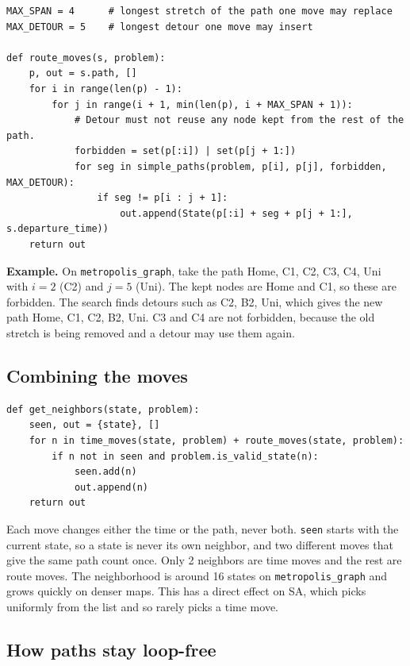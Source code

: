 \documentclass[11pt,a4paper]{article}
\newcommand{\col}[1]{\texttt{#1}}
\begin{document}
\begin{lstlisting}
MAX_SPAN = 4      # longest stretch of the path one move may replace
MAX_DETOUR = 5    # longest detour one move may insert

def route_moves(s, problem):
    p, out = s.path, []
    for i in range(len(p) - 1):
        for j in range(i + 1, min(len(p), i + MAX_SPAN + 1)):
            # Detour must not reuse any node kept from the rest of the path.
            forbidden = set(p[:i]) | set(p[j + 1:])
            for seg in simple_paths(problem, p[i], p[j], forbidden, MAX_DETOUR):
                if seg != p[i : j + 1]:
                    out.append(State(p[:i] + seg + p[j + 1:], s.departure_time))
    return out
\end{lstlisting}

\noindent\textbf{Example.} On \col{metropolis\_graph}, take the path Home, C1, C2, C3, C4, Uni with
$i = 2$ (C2) and $j = 5$ (Uni). The kept nodes are Home and C1, so these are forbidden. The search
finds detours such as C2, B2, Uni, which gives the new path Home, C1, C2, B2, Uni. C3 and C4 are not
forbidden, because the old stretch is being removed and a detour may use them again.

\subsection{Combining the moves}

\begin{lstlisting}
def get_neighbors(state, problem):
    seen, out = {state}, []
    for n in time_moves(state, problem) + route_moves(state, problem):
        if n not in seen and problem.is_valid_state(n):
            seen.add(n)
            out.append(n)
    return out
\end{lstlisting}

\noindent Each move changes either the time or the path, never both. \col{seen} starts with the
current state, so a state is never its own neighbor, and two different moves that give the same path
count once. Only 2 neighbors are time moves and the rest are route moves. The neighborhood is around
16 states on \col{metropolis\_graph} and grows quickly on denser maps. This has a direct effect on SA,
which picks uniformly from the list and so rarely picks a time move.

\subsection{How paths stay loop-free}
\end{document}
